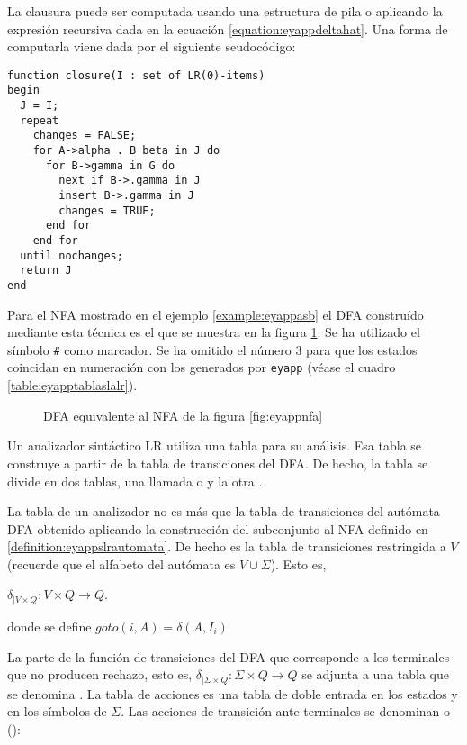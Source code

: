 La clausura puede ser computada usando una estructura de pila o aplicando 
la expresión recursiva dada en la ecuación \ref{equation:eyappdeltahat}.
Una forma de computarla viene dada por el siguiente seudocódigo:
\begin{verbatim}
function closure(I : set of LR(0)-items) 
begin
  J = I;
  repeat
    changes = FALSE;
    for A->alpha . B beta in J do
      for B->gamma in G do
        next if B->.gamma in J
        insert B->.gamma in J
        changes = TRUE;
      end for
    end for
  until nochanges;
  return J
end
\end{verbatim}


Para el NFA mostrado en el ejemplo \ref{example:eyappasb} el DFA construído mediante esta
técnica es el que se muestra en la figura \ref{fig:eyappdfa}. Se ha utilizado el símbolo
\verb|#| como marcador. Se ha omitido el número 3 para que los estados coincidan
en numeración con los generados por \verb|eyapp| (véase el cuadro
\ref{table:eyapptablaslalr}).

\begin{center}
\begin{figure}
\label{fig:eyappdfa}
\centerline{}
\caption{DFA equivalente al NFA de la figura \ref{fig:eyappnfa}}
\end{figure}
\end{center}


Un analizador sintáctico LR utiliza una tabla para su análisis.
Esa tabla se construye a partir de la tabla de transiciones del DFA.
De hecho, la tabla se divide en dos tablas, una llamada 
 o  y la otra
.

La tabla  de un analizador 
no es más que la tabla de transiciones del autómata DFA 
obtenido aplicando la construcción del subconjunto al NFA
definido en \ref{definition:eyappslrautomata}. De hecho es la tabla
de transiciones restringida a $V$ (recuerde que el alfabeto del
autómata es $V \cup \Sigma$).
Esto es, 

\begin{center}
$\delta_{| V \times Q} :  V \times Q \rightarrow Q$. 

donde se define $goto(i, A) = \delta(A,I_i)$
\end{center}

La parte de la función de transiciones
del DFA que corresponde a los terminales que no producen rechazo, 
esto es, $\delta_{| \Sigma \times Q} :  \Sigma \times Q \rightarrow Q$
se adjunta a una tabla que se denomina .
La tabla de acciones es una tabla de doble entrada en los estados
y en los símbolos de $\Sigma$.
Las acciones de transición ante terminales 
se denominan  o ():

